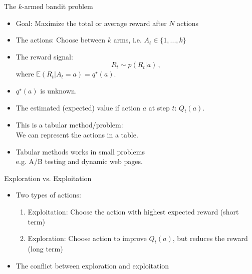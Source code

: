 \documentclass[10pt]{beamer}
\begin{document}
\begin{frame}{The $k$-armed bandit problem}

\begin{itemize}
\item {\color{uured} Goal}: Maximize the total or average reward after $N$ actions\pause
\item {\color{uured} The actions}: Choose between $k$ arms, i.e. $A_t \in \{1,...,k \}$\pause
\item The reward signal:
\[
R_{t} \sim p(R_t|a)\,,
\]
where $\mathbb{E}(R_{t}|A_t = a) = q^\star(a)$.\pause
\item $q^\star(a)$ is {\color{uured} unknown}.\pause
\item The estimated (expected) value if action $a$ at step $t$: $Q_t(a)$.\pause\vspace{3mm}
\item This is a {\color{uured} tabular} method/problem: \\ We can represent the actions in a table.
\item Tabular methods works in small problems\\ e.g. A/B testing and dynamic web pages.
\end{itemize}

\end{frame}

\begin{frame}{Exploration vs. Exploitation}

\begin{itemize}
\item Two types of actions:
\begin{enumerate}
\item Exploitation: Choose the action with highest expected reward (short term)
\item Exploration: Choose action to improve $Q_t(a)$, but reduces the reward (long term)
\end{enumerate}
\item The {\color{uured} conflict} between exploration and exploitation
\end{itemize}

\end{frame}
\end{document}
